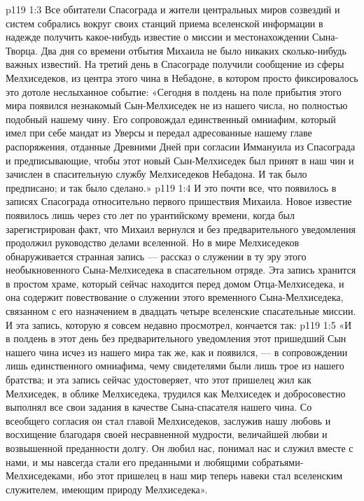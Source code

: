 \vs p119 1:3 Все обитатели Спасограда и жители центральных миров созвездий и систем собрались вокруг своих станций приема вселенской информации в надежде получить какое\hyp{}нибудь известие о миссии и местонахождении Сына\hyp{}Творца. Два дня со времени отбытия Михаила не было никаких сколько\hyp{}нибудь важных известий. На третий день в Спасограде получили сообщение из сферы Мелхиседеков, из центра этого чина в Небадоне, в котором просто фиксировалось это дотоле неслыханное событие: «Сегодня в полдень на поле прибытия этого мира появился незнакомый Сын\hyp{}Мелхиседек не из нашего числа, но полностью подобный нашему чину. Его сопровождал единственный омниафим, который имел при себе мандат из Уверсы и передал адресованные нашему главе распоряжения, отданные Древними Дней при согласии Иммануила из Спасограда и предписывающие, чтобы этот новый Сын\hyp{}Мелхиседек был принят в наш чин и зачислен в спасительную службу Мелхиседеков Небадона. И так было предписано; и так было сделано.»
\vs p119 1:4 И это почти все, что появилось в записях Спасограда относительно первого пришествия Михаила. Новое известие появилось лишь через сто лет по урантийскому времени, когда был зарегистрирован факт, что Михаил вернулся и без предварительного уведомления продолжил руководство делами вселенной. Но в мире Мелхиседеков обнаруживается странная запись --- рассказ о служении в ту эру этого необыкновенного Сына\hyp{}Мелхиседека в спасательном отряде. Эта запись хранится в простом храме, который сейчас находится перед домом Отца\hyp{}Мелхиседека, и она содержит повествование о служении этого временного Сына\hyp{}Мелхиседека, связанном с его назначением в двадцать четыре вселенские спасательные миссии. И эта запись, которую я совсем недавно просмотрел, кончается так:
\vs p119 1:5 «И в полдень в этот день без предварительного уведомления этот пришедший Сын нашего чина исчез из нашего мира так же, как и появился, --- в сопровождении лишь единственного омниафима, чему свидетелями были лишь трое из нашего братства; и эта запись сейчас удостоверяет, что этот пришелец жил как Мелхиседек, в облике Мелхиседека, трудился как Мелхиседек и добросовестно выполнял все свои задания в качестве Сына\hyp{}спасателя нашего чина. Со всеобщего согласия он стал главой Мелхиседеков, заслужив нашу любовь и восхищение благодаря своей несравненной мудрости, величайшей любви и возвышенной преданности долгу. Он любил нас, понимал нас и служил вместе с нами, и мы навсегда стали его преданными и любящими собратьями\hyp{}Мелхиседеками, ибо этот пришелец в наш мир теперь навеки стал вселенским служителем, имеющим природу Мелхиседека».
